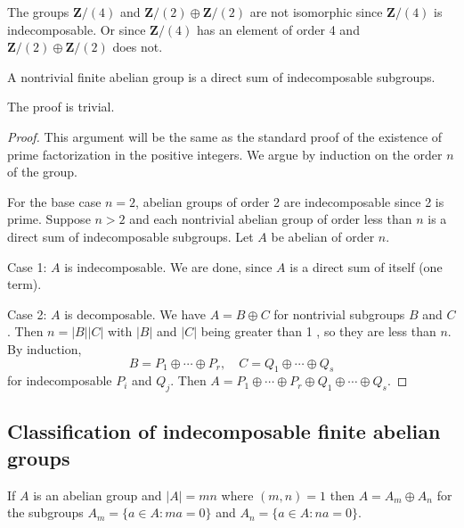 \begin{remark}
The groups $\mathbf{Z} /(4)$ and $\mathbf{Z} /(2) \oplus \mathbf{Z} /(2)$ are not isomorphic since $\mathbf{Z} /(4)$ is indecomposable. Or since $\mathbf{Z} /(4)$ has an element of order 4 and $\mathbf{Z} /(2) \oplus \mathbf{Z} /(2)$ does not.
\end{remark}
\begin{theorem}[Theorem 2.5]
A nontrivial finite abelian group is a direct sum of indecomposable subgroups.
\end{theorem}
\begin{note}
The proof is trivial.
\end{note}
\begin{proof}
This argument will be the same as the standard proof of the existence of prime factorization in the positive integers. We argue by induction on the order $n$ of the group.

For the base case $n=2$, abelian groups of order 2 are indecomposable since 2 is prime. Suppose $n>2$ and each nontrivial abelian group of order less than $n$ is a direct sum of indecomposable subgroups. Let $A$ be abelian of order $n$.

Case 1: $A$ is indecomposable. We are done, since $A$ is a direct sum of itself (one term).

Case 2: $A$ is decomposable. We have $A=B \oplus C$ for nontrivial subgroups $B$ and $C$. Then $n=|B||C|$ with $|B|$ and $|C|$ being greater than 1 , so they are less than $n$. By induction,
\[
B=P_1 \oplus \cdots \oplus P_r, \quad C=Q_1 \oplus \cdots \oplus Q_s
\]
for indecomposable $P_i$ and $Q_j$. Then $A=P_1 \oplus \cdots \oplus P_r \oplus Q_1 \oplus \cdots \oplus Q_s$.
\end{proof}

\subsection{Classification of indecomposable finite abelian groups}

\begin{lemma}
If $A$ is an abelian group and $|A|=m n$ where $(m, n)=1$ then $A=A_m \oplus A_n$ for the subgroups $A_m=\{a \in A: m a=0\}$ and $A_n=\{a \in A: n a=0\}$.\label{897c32}
\end{lemma}

